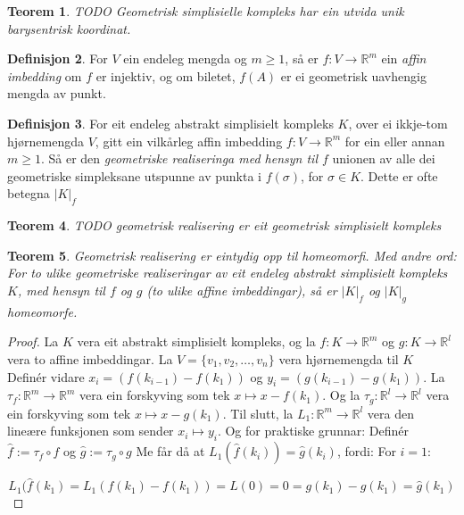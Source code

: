 \documentclass[a4paper, titlepage, 12pt, norsk]{article}
\theoremstyle{plain}
\newtheorem{theorem}{Teorem}[section]
\theoremstyle{definition}
\newtheorem{definition}[theorem]{Definisjon}
\newcommand{\Rb}{\mathbb{R}}
\newcommand{\gr}[1]{ \lvert #1 \rvert } %
\begin{document}
\begin{theroem}
\begin{theorem}
	TODO Geometrisk simplisielle kompleks har ein utvida unik barysentrisk koordinat.
\end{theorem}

\begin{definition}
	For $V$ ein endeleg mengda og $m\geq1$, så er $f:V\rightarrow \Rb^m$ ein \emph{affin imbedding} om $f$ er injektiv, og om biletet, $f(A)$ er ei geometrisk uavhengig mengda av punkt.
\end{definition}

\begin{definition}
	For eit endeleg abstrakt simplisielt kompleks $K$, over ei ikkje-tom hjørnemengda $V$, gitt ein vilkårleg affin imbedding $f:V\to\Rb^m$ for ein eller annan $m\geq1$. Så er den \emph{geometriske realiseringa med hensyn til $f$} unionen av alle dei geometriske simpleksane utspunne av punkta i $f(\sigma)$, for $\sigma\in K$. Dette er ofte betegna $\gr{K}_f$
\end{definition}

\begin{theorem}
	TODO geometrisk realisering er eit geometrisk simplisielt kompleks
\end{theorem}

\begin{theorem}
	Geometrisk realisering er eintydig opp til homeomorfi. Med andre ord: For to ulike geometriske realiseringar av eit endeleg abstrakt simplisielt kompleks $K$, med hensyn til $f$ og $g$ (to ulike affine imbeddingar), så er $\gr{K}_f$ og $\gr{K}_g$ homeomorfe.
\end{theorem}

\begin{proof}%
	La $K$ vera eit abstrakt simplisielt kompleks, og la $f:K\to\Rb^m$ og $g:K\to\Rb^l$ vera to affine imbeddingar. La $V=\{ v_1, v_2, \dots, v_n \}$ vera hjørnemengda til $K$ Definér vidare $x_i=(f(k_{i-1})-f(k_1))$ og $y_i=(g(k_{i-1})-g(k_1))$. La $\tau_f:\Rb^m\to\Rb^m$ vera ein forskyving som tek $x\mapsto x-f(k_1)$. Og la $\tau_g:\Rb^l\to\Rb^l$ vera ein forskyving som tek $x\mapsto x-g(k_1)$. Til slutt, la $L_1:\Rb^m\to\Rb^l$ vera den lineære funksjonen som sender $x_i\mapsto y_i$.
	Og for praktiske grunnar: Definér $\hat{f}:=\tau_f\circ f$ og $\hat{g}:=\tau_g \circ g$
Me får då at $L_1(\hat{f}(k_i))=\hat{g}(k_i)$, fordi:
For $i=1$:

	\begin{equation*}
		L_1(\hat{f}(k_1)=L_1(f(k_1)-f(k_1))=L(0)=0=g(k_1)-g(k_1)=\hat{g}(k_1)
	\end{equation*}


\end{proof}
\end{theroem}
\end{document}

